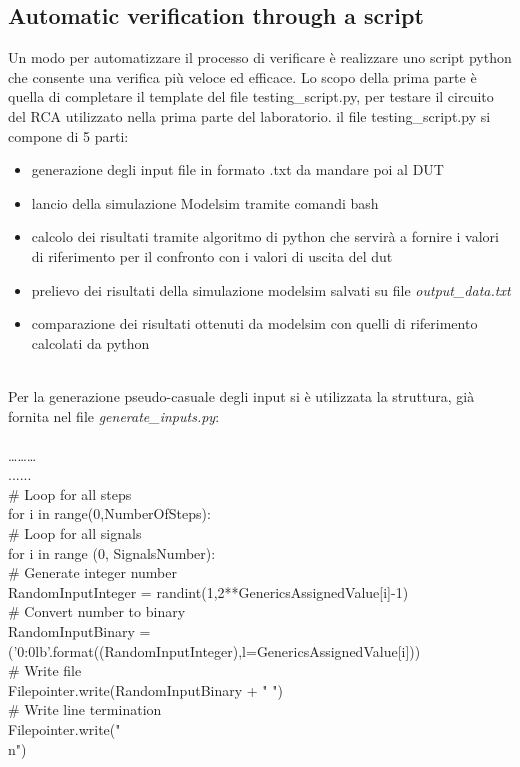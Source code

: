 \subsection{Automatic verification through a script}
Un modo per automatizzare il processo di verificare è realizzare uno script python che consente una verifica più veloce ed efficace. Lo scopo della prima parte è quella di completare il template del file testing\_script.py, per testare il circuito del RCA utilizzato nella prima parte del laboratorio.
il file testing\_script.py  si compone di 5 parti:
\begin{itemize}
	\item{generazione degli input file in formato .txt da mandare poi al DUT}
	\item{lancio della simulazione Modelsim tramite comandi bash}
	\item{calcolo dei risultati tramite algoritmo di python che servirà a fornire i valori di riferimento per il confronto con i valori  di uscita del dut}
	\item{prelievo dei risultati della simulazione modelsim salvati su file \textit{output\_data.txt}}
	\item{comparazione dei risultati ottenuti da modelsim con quelli di riferimento calcolati da python}
\end{itemize}
\\
Per la generazione pseudo-casuale degli input si è utilizzata la struttura, già fornita nel file \textit{generate\_inputs.py}:\\
\\
………\\
......\\
\# Loop for all steps\\
for i in range(0,NumberOfSteps):\\
\# Loop for all signals\\
for i in range (0, SignalsNumber):\\
\# Generate integer number\\
RandomInputInteger = randint(1,2**GenericsAssignedValue[i]-1)\\
\# Convert number to binary\\
RandomInputBinary = ('{0:0{l}b}'.format((RandomInputInteger),l=GenericsAssignedValue[i]))\\
\# Write file\\
Filepointer.write(RandomInputBinary + " ")\\
\# Write line termination\\
Filepointer.write("\\n")\\
